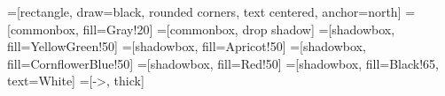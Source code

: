 =[rectangle, draw=black, rounded corners, text centered,
	anchor=north]
=[commonbox, fill=Gray!20]
=[commonbox, drop shadow]
=[shadowbox, fill=YellowGreen!50]
=[shadowbox, fill=Apricot!50]
=[shadowbox, fill=CornflowerBlue!50]
=[shadowbox, fill=Red!50]
=[shadowbox, fill=Black!65, text=White]
=[->, thick]
